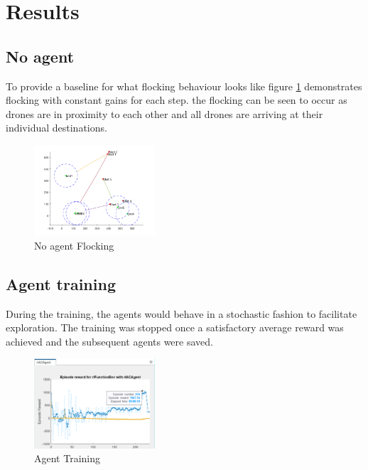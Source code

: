 
\section{Results}
\subsection{No agent}
To provide a baseline for what flocking behaviour looks like figure \ref{fig:NoAgentFlocking} demonstrates flocking with constant gains for each step. the flocking can be seen to occur as drones are in proximity to each other and all drones are arriving at their individual destinations.

\begin{figure}[h]
  \begin{center}
    \includegraphics[width=0.4\textwidth]{figures/NoAgent.png}
    \end{center}
    \caption{No agent Flocking}
    \label{fig:NoAgentFlocking}
\end{figure}

\subsection{Agent training}
During the training, the agents would behave in a stochastic fashion to facilitate exploration. The training was stopped once a satisfactory average reward was achieved and the subsequent agents were saved.


\begin{figure}[h]
  \begin{center}
    \includegraphics[width=0.4\textwidth]{figures/TrainingData.PNG}
    \end{center}
    \caption{Agent Training}
    \label{fig:Agent Training}
\end{figure}

